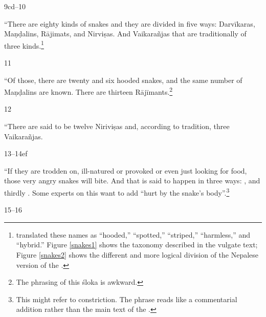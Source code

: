     \begin{translation}
        \item[9cd--10]    
        
        “There are eighty kinds of snakes and they are divided in five ways:
        Darvīkaras, Maṇḍalins, Rājimats, and Nirviṣas.  And Vaikarañjas that are
        traditionally of three kinds.\footnote{\citet{hari-2011} translated these
            names as “hooded,” “spotted,” “striped,” “harmless,” and “hybrid.” Figure 
            \ref{snakes1} shows the taxonomy described in the vulgate text; Figure 
            \ref{snakes2} shows the different and more logical division of the Nepalese 
            version of the \SS.}
            
    \item [11] 
    
    “Of those, there are twenty and six hooded snakes, and the same number
of Maṇḍalins are known.  There are thirteen Rājīmants.\footnote{The phrasing of
    this śloka is awkward.}
    
    \item [12]
    
    “There are said to be twelve Niriviṣas and, according to tradition, three 
    Vaikarañjas.
    
    \item [13--14ef]
    
“If they are trodden on, ill-natured or provoked or even just looking for
food, those very angry snakes will bite.  And that is said to happen in
three ways: ,  and thirdly
.  Some experts on this want to add “hurt by the
snake's body”.\footnote{This might refer to constriction.  The phrase reads
    like a commentarial addition rather than the main text of the \SS.}

\item[15--16]


\end{translation}
